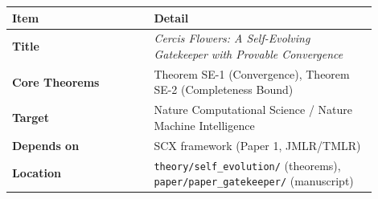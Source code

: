 \documentclass[
  12pt,
]{article}
\begin{document}
\begin{longtable}[]{@{}p{0.35\linewidth}p{0.55\linewidth}@{}}
\toprule\noalign{}
\begin{minipage}[b]{\linewidth}\raggedright
Item
\end{minipage} & \begin{minipage}[b]{\linewidth}\raggedright
Detail
\end{minipage} \\
\midrule\noalign{}
\endhead
\bottomrule\noalign{}
\endlastfoot
\textbf{Title} & \emph{Cercis Flowers: A Self-Evolving Gatekeeper with
Provable Convergence} \\
\textbf{Core Theorems} & Theorem SE-1 (Convergence), Theorem SE-2
(Completeness Bound) \\
\textbf{Target} & Nature Computational Science / Nature Machine
Intelligence \\
\textbf{Depends on} & SCX framework (Paper 1, JMLR/TMLR) \\
\textbf{Location} & \texttt{theory/self\_evolution/} (theorems),
\texttt{paper/paper\_gatekeeper/} (manuscript) \\
\end{longtable}
\end{document}
